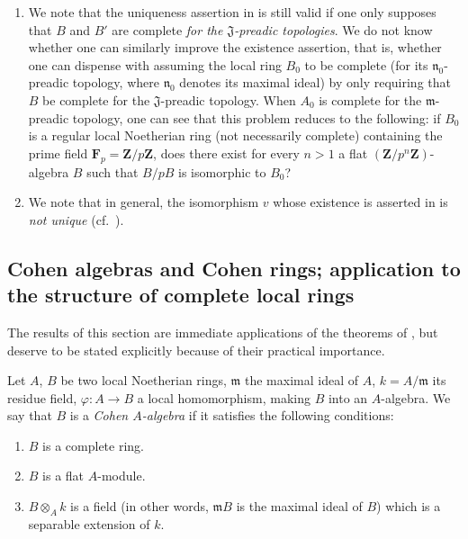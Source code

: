 \begin{remarks}[19.7.3]
\label{0.19.7.3}
\begin{enumerate}
  \item[\rm(i)] We note that the uniqueness assertion in  is still valid if one only supposes that $B$ and $B'$ are complete \emph{for the $\mathfrak{J}$-preadic topologies}.
We do not know whether one can similarly improve the existence assertion, that is, whether one can dispense with assuming the local ring $B_0$ to be complete (for its $\mathfrak{n}_0$-preadic topology, where $\mathfrak{n}_0$ denotes its maximal ideal) by only requiring that $B$ be complete for the $\mathfrak{J}$-preadic topology.
When $A_0$ is complete for the $\mathfrak{m}$-preadic topology, one can see that this problem reduces to the following: if $B_0$ is a regular local Noetherian ring (not necessarily complete) containing the prime field $\mathbf{F}_p=\mathbf{Z}/p\mathbf{Z}$, does there exist for every $n>1$ a flat $(\mathbf{Z}/p^n\mathbf{Z})$-algebra $B$ such that $B/pB$ is isomorphic to $B_0$?
  \item[\rm(ii)] We note that in general, the isomorphism $v$ whose existence is asserted in  is \emph{not unique} (cf.\ ).
\end{enumerate}
\end{remarks}

\subsection{Cohen algebras and Cohen rings; application to the structure of complete local rings}
\label{subsection:0.19.8}

The results of this section are immediate applications of the theorems of , but deserve to be stated explicitly because of their practical importance.

\begin{definition}[19.8.1]
\label{0.19.8.1}
Let $A$, $B$ be two local Noetherian rings, $\mathfrak{m}$ the maximal ideal of $A$, $k=A/\mathfrak{m}$ its residue field, $\varphi:A\to B$ a local homomorphism, making $B$ into an $A$-algebra.
We say that $B$ is a \emph{Cohen $A$-algebra} if it satisfies the following conditions:
\begin{enumerate}
  \item[\rm(i)] $B$ is a complete ring.
  \item[\rm(ii)] $B$ is a flat $A$-module.
  \item[\rm(iii)] $B\otimes_A k$ is a field (in other words, $\mathfrak{m}B$ is the maximal ideal of $B$) which is a separable extension of $k$.
\end{enumerate}
\end{definition}

